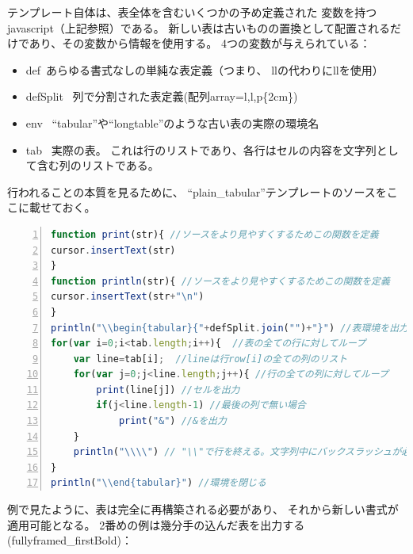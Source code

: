 テンプレート自体は、表全体を含むいくつかの予め定義された
変数を持つjavascript（上記参照）である。
新しい表は古いものの置換として配置されるだけであり、その変数から情報を使用する。
4つの変数が与えられている：

\begin{itemize}
\item
  def\ 
  あらゆる書式なしの単純な表定義（つまり、
  \textbar{}l\textbar{}l\textbar{}の代わりにllを使用）
\item
  defSplit \ 列で分割された表定義(配列array=l,l,p\{2cm\})
\item
  env \ ``tabular''や``longtable''のような古い表の実際の環境名
\item
  tab \ 実際の表。
  これは行のリストであり、各行はセルの内容を文字列として含む列のリストである。
\end{itemize}

行われることの本質を見るために、
``plain\_tabular''テンプレートのソースをここに載せておく。

\begin{lstlisting}[frame=single,language=JavaScript,breaklines=true,numbers=left]
function print(str){ //ソースをより見やすくするためこの関数を定義
cursor.insertText(str)
}
function println(str){ //ソースをより見やすくするためこの関数を定義
cursor.insertText(str+"\n")
}
println("\\begin{tabular}{"+defSplit.join("")+"}") //表環境を出力
for(var i=0;i<tab.length;i++){  //表の全ての行に対してループ
    var line=tab[i];  //lineは行row[i]の全ての列のリスト
    for(var j=0;j<line.length;j++){ //行の全ての列に対してループ
        print(line[j]) //セルを出力
        if(j<line.length-1) //最後の列で無い場合
            print("&") //&を出力
    }
    println("\\\\") // "\\"で行を終える。文字列中にバックスラッシュが必要なことに注意。
}
println("\\end{tabular}") //環境を閉じる
\end{lstlisting}

例で見たように、表は完全に再構築される必要があり、
それから新しい書式が適用可能となる。
2番めの例は幾分手の込んだ表を出力する(fullyframed\_firstBold)：

